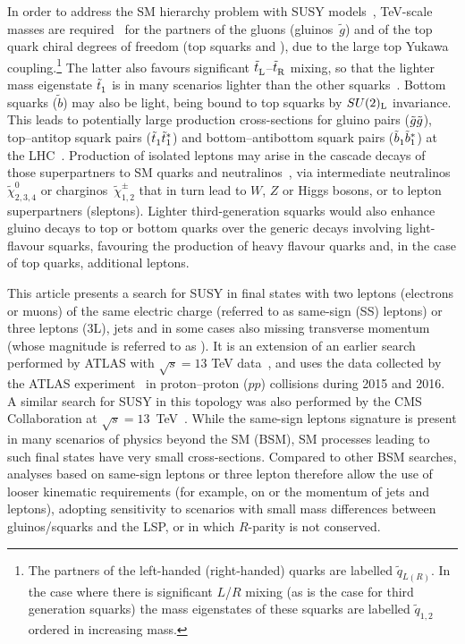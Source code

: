 \documentclass{outhesis}
\begin{document}
In order to address the SM hierarchy problem with SUSY models~\cite{Sakai:1981gr,Dimopoulos:1981yj,Ibanez:1981yh,Dimopoulos:1981zb}, 
TeV-scale masses are required~\cite{Barbieri:1987fn,deCarlos:1993yy} for the partners of the gluons (gluinos~$\tilde{g}$) 
and of the top quark chiral degrees of freedom (top squarks \stopL and \stopR), due to the large top Yukawa coupling.\footnote{The 
partners of the left-handed (right-handed) quarks are labelled $\tilde{q}_{L(R)}$. In the case where there is significant $L$/$R$ 
mixing (as is the case for third generation squarks) the mass eigenstates of these squarks are labelled $\tilde{q}_{1,2}$ ordered 
in increasing mass.} The latter also favours significant $\tilde{t}^{}_{\mathrm{L}}$--$\tilde{t}^{}_{\mathrm{R}}$ mixing, 
so that the lighter mass eigenstate $\tilde{t}^{}_1$ is in many scenarios lighter than the other squarks~\cite{Inoue:1982pi,Ellis:1983ed}. 
Bottom squarks ($\tilde{b}$) may also be light, being bound to top squarks by $SU(2)_{\rm L}$ invariance. 
This leads to potentially large production cross-sections 
for gluino pairs ($\tilde{g}\tilde{g}$), top--antitop squark pairs ($\tilde{t}^{}_1\tilde{t}^{*}_1$) and bottom--antibottom squark pairs 
($\tilde{b}^{}_1\tilde{b}^{*}_1$) at the LHC~\cite{Borschensky:2014cia}. 
Production of isolated leptons may arise in the cascade decays of those superpartners to SM quarks and neutralinos~\ninoone, 
via intermediate neutralinos~$\tilde\chi^0_{2,3,4}$ or charginos~$\tilde\chi^\pm_{1,2}$ 
that in turn lead to $W$, $Z$ or Higgs bosons, or to lepton superpartners (sleptons). 
Lighter third-generation squarks would also enhance gluino decays to top or bottom quarks 
over the generic decays involving light-flavour squarks,
favouring the production of heavy flavour quarks and, in the case of top quarks, additional leptons. 

This article presents a search for SUSY in final states with two leptons (electrons or muons) of the same electric charge 
(referred to as same-sign (SS) leptons) or three leptons (3L), jets and in some cases also missing transverse momentum 
(whose magnitude is referred to as \met). 
It is an extension of an earlier search performed by ATLAS with $\sqrt s=13$ TeV data~\cite{paperSS3L}, 
and uses the data collected by the ATLAS experiment~\cite{PERF-2007-01} in proton--proton ($pp$) collisions during 2015 and 2016.  
A similar search for SUSY in this topology was also performed by the CMS Collaboration at $\sqrt s=13$~TeV~\cite{Khachatryan:2016kod, Khachatryan:2017qgo}.
While the same-sign leptons signature is present in many scenarios of physics beyond the SM (BSM), 
SM processes leading to such final states have very small cross-sections. 
Compared to other BSM searches, analyses based on same-sign leptons or three lepton therefore allow 
the use of looser kinematic requirements (for example, on \met or the momentum of jets and leptons), 
adopting sensitivity to scenarios with small mass differences between gluinos/squarks and the LSP, or in which 
$R$-parity is not conserved.%
\end{document}

